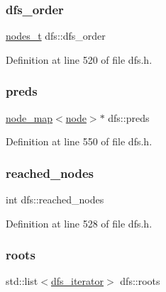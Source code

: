 \subsubsection{\texorpdfstring{dfs\+\_\+order}{dfs\_order}}
{\footnotesize\ttfamily \mbox{\hyperlink{edge_8h_a22ac17689106ba21a84e7bc54d1199d6}{nodes\+\_\+t}} dfs\+::dfs\+\_\+order\hspace{0.3cm}{\ttfamily [protected]}}



Definition at line 520 of file dfs.\+h.

\mbox{\label{classdfs_a3fdeb5a211a1bc1753b2a637258c5355}} 
\subsubsection{\texorpdfstring{preds}{preds}}
{\footnotesize\ttfamily \mbox{\hyperlink{classnode__map}{node\+\_\+map}}$<$\mbox{\hyperlink{classnode}{node}}$>$$\ast$ dfs\+::preds\hspace{0.3cm}{\ttfamily [protected]}}



Definition at line 550 of file dfs.\+h.

\mbox{\label{classdfs_acb11186a1a2a2a1f38cdc0674340ba37}} 
\subsubsection{\texorpdfstring{reached\+\_\+nodes}{reached\_nodes}}
{\footnotesize\ttfamily int dfs\+::reached\+\_\+nodes\hspace{0.3cm}{\ttfamily [protected]}}



Definition at line 528 of file dfs.\+h.

\mbox{\label{classdfs_a0bbd5cb8df26c891b74dadd84b46a06b}} 
\subsubsection{\texorpdfstring{roots}{roots}}
{\footnotesize\ttfamily std\+::list$<$\mbox{\hyperlink{classdfs_a15fe023a5a1f7ddda00f3d87110d9a32}{dfs\+\_\+iterator}}$>$ dfs\+::roots\hspace{0.3cm}{\ttfamily [protected]}}



